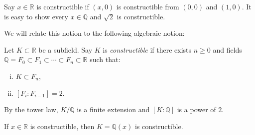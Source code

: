 \documentclass[12pt]{article}
\begin{document}
Say $x \in \mathbb{R}$ is constructible if $(x, 0)$ is constructible from $(0, 0)$ and $(1, 0)$. It is easy to show every $x \in \mathbb{Q}$ and $\sqrt 2$ is constructible.

We will relate this notion to the following algebraic notion:

\begin{definition} 
	Let $K \subset \mathbb{R}$ be a subfield. Say $K$ is \emph{constructible} if there exists $n \geq 0$ and fields $\mathbb{Q} = F_0 \subset F_1 \subset \cdots \subset F_n \subset \mathbb{R}$ such that:
	\begin{enumerate}[(i)]
		\item $K \subset F_n$,
		\item $[F_i : F_{i-1}] = 2$.
	\end{enumerate}
\end{definition}

\begin{remark}
	By the tower law, $K / \mathbb{Q}$ is a finite extension and $[K : \mathbb{Q}]$ is a power of $2$.
\end{remark}

\begin{theorem}
	If $x \in \mathbb{R}$ is constructible, then $K = \mathbb{Q}(x)$ is constructible.
\end{theorem}
\end{document}
